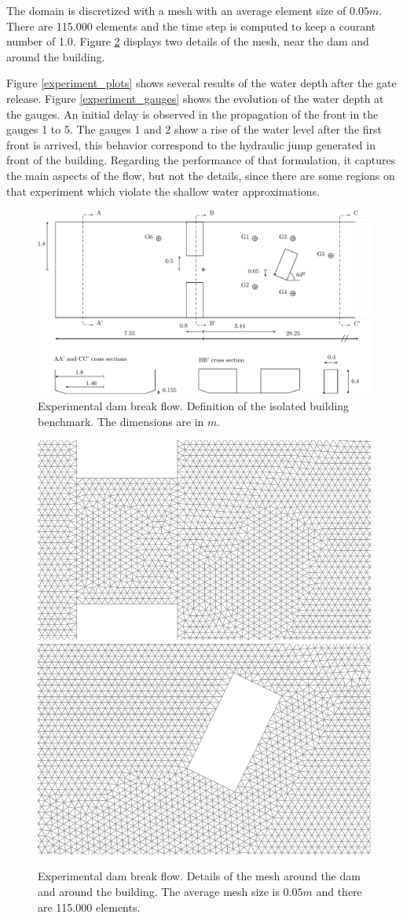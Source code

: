 \documentclass[a4paper,12pt]{article}
\begin{document}
The domain is discretized with a mesh with an average element size of $0.05m$. There are 115.000 elements and the time step is computed to keep a courant number of 1.0. Figure \ref{experiment_mesh} displays two details of the mesh, near the dam and around the building.

Figure \ref{experiment_plots} shows several results of the water depth after the gate release. Figure \ref{experiment_gauges} shows the evolution of the water depth at the gauges. An initial delay is observed in the propagation of the front in the gauges 1 to 5.
The gauges 1 and 2 show a rise of the water level after the first front is arrived, this behavior correspond to the hydraulic jump generated in front of the building.
Regarding the performance of that formulation, it captures the main aspects of the flow, but not the details, since there are some regions on that experiment which violate the shallow water approximations.

\begin{figure}[H]
\centering
\includegraphics[width=\textwidth]{img/exp/sketch.pdf}
\caption{Experimental dam break flow. Definition of the isolated building benchmark. The dimensions are in $m$.}
\label{experiment_sketch}
\end{figure}


\begin{figure}[H]
\centering
\includegraphics[width=.49\textwidth]{img/exp/mesh_dam.png}
\hfill
\includegraphics[width=.47\textwidth]{img/exp/mesh_building.png}
\caption{Experimental dam break flow. Details of the mesh around the dam and around the building. The average mesh size is $0.05m$ and there are 115.000 elements.}
\label{experiment_mesh}
\end{figure}
\end{document}
